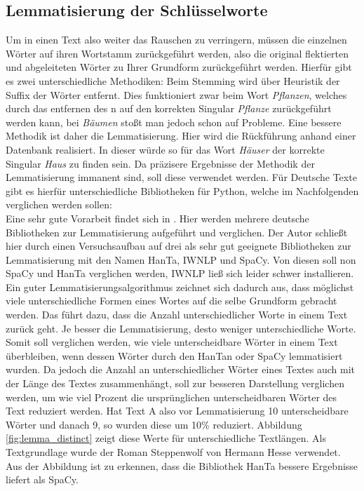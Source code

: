 \subsection{Lemmatisierung der Schlüsselworte}
Um in einen Text also weiter das Rauschen zu verringern, müssen die einzelnen Wörter auf ihren Wortstamm zurückgeführt werden, also die original flektierten und abgeleiteten Wörter zu Ihrer Grundform zurückgeführt werden. Hierfür gibt es zwei unterschiedliche Methodiken: Beim Stemming wird über Heuristik der Suffix der Wörter entfernt. Dies funktioniert zwar beim Wort \textit{Pflanzen}, welches durch das entfernen des n auf den korrekten Singular \textit{Pflanze} zurückgeführt werden kann, bei \textit{Bäumen} stoßt man jedoch schon auf Probleme. Eine bessere Methodik ist daher die Lemmatisierung. Hier wird die Rückführung anhand einer Datenbank realisiert. In dieser würde so für das Wort \textit{Häuser} der korrekte Singular \textit{Haus} zu finden sein. Da präzisere Ergebnisse der Methodik der Lemmatisierung immanent sind, soll diese verwendet werden. Für Deutsche Texte gibt es hierfür unterschiedliche Bibliotheken für Python, welche im Nachfolgenden verglichen werden sollen: \\ \newline
Eine sehr gute Vorarbeit findet sich in \cite{lemma}. Hier werden mehrere deutsche Bibliotheken zur Lemmatisierung aufgeführt und verglichen. Der Autor schließt hier durch einen Versuchsaufbau auf drei als sehr gut geeignete Bibliotheken zur Lemmatisierung mit den Namen HanTa, IWNLP  und SpaCy. Von diesen soll non SpaCy und HanTa verglichen werden, IWNLP ließ sich leider schwer installieren.\\ \newline
Ein guter Lemmatisierungsalgorithmus zeichnet sich dadurch aus, dass möglichst viele unterschiedliche Formen eines Wortes auf die selbe Grundform gebracht werden. Das führt dazu, dass die Anzahl unterschiedlicher Worte in einem Text zurück geht. Je besser die Lemmatisierung, desto weniger unterschiedliche Worte. Somit soll verglichen werden, wie viele unterscheidbare Wörter in einem Text überbleiben, wenn dessen Wörter durch den HanTan oder SpaCy lemmatisiert wurden. Da jedoch die Anzahl an unterschiedlicher Wörter eines Textes auch mit der Länge des Textes zusammenhängt, soll zur besseren Darstellung verglichen werden, um wie viel Prozent die ursprünglichen unterscheidbaren Wörter des Text reduziert werden. Hat Text A also vor Lemmatisierung 10 unterscheidbare Wörter und danach 9, so wurden diese um 10\% reduziert. Abbildung \ref{fig:lemma_distinct} zeigt diese Werte für unterschiedliche Textlängen. Als Textgrundlage wurde der Roman Steppenwolf von Hermann Hesse verwendet. Aus der Abbildung ist zu erkennen, dass die Bibliothek HanTa bessere Ergebnisse liefert als SpaCy. \\ \newline 
